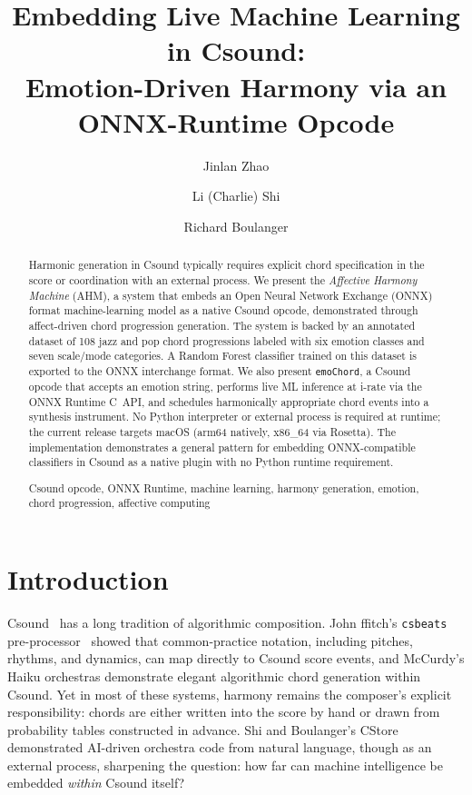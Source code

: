 \documentclass[runningheads,a4paper]{llncs}
\newcommand{\keywords}[1]{\par\addvspace\baselineskip
\noindent\keywordname\enspace\ignorespaces#1}
\begin{document}
\mainmatter

\title{Embedding Live Machine Learning in Csound:\texorpdfstring{\\}{ }%
Emotion-Driven Harmony via an ONNX-Runtime Opcode}


\author{Jinlan Zhao \and Li (Charlie) Shi \and Richard Boulanger}

\maketitle

\begin{abstract}
Harmonic generation in Csound typically requires explicit chord specification
in the score or coordination with an external process. We present the
\emph{Affective Harmony Machine} (AHM), a system that embeds an Open Neural Network Exchange (ONNX) format
machine-learning model as a native Csound opcode, demonstrated through
affect-driven chord progression generation. The system is backed by
an annotated dataset of 108 jazz and pop chord progressions labeled with six
emotion classes and seven scale/mode categories. A Random Forest classifier trained on
this dataset is exported to the ONNX interchange format. We also present
\texttt{emoChord}, a Csound opcode that accepts an emotion string, performs live
ML inference at i-rate via the ONNX Runtime C~API, and schedules harmonically
appropriate chord events into a synthesis instrument. No Python interpreter or
external process is required at runtime; the current release targets macOS
(arm64 natively, x86\_64 via Rosetta). The implementation demonstrates
a general pattern for embedding ONNX-compatible classifiers in Csound as a
native plugin with no Python runtime requirement.
\keywords{Csound opcode, ONNX Runtime, machine learning, harmony generation,
emotion, chord progression, affective computing}
\end{abstract}


\section{Introduction}

Csound~\cite{lazzarini2016} has a long tradition of algorithmic composition.
John ffitch's \texttt{csbeats} pre-processor~\cite{boulanger2000} showed that
common-practice notation, including pitches, rhythms, and dynamics, can map
directly to Csound score events, and McCurdy's Haiku orchestras demonstrate
elegant algorithmic chord generation within Csound. Yet in most of these systems, harmony
remains the composer's explicit responsibility: chords are either written into
the score by hand or drawn from probability tables constructed in advance.
Shi and Boulanger's CStore~\cite{shi2026} demonstrated AI-driven orchestra
code from natural language, though as an external process, sharpening
the question: how far can machine intelligence be embedded \emph{within}
Csound itself?
\end{document}
